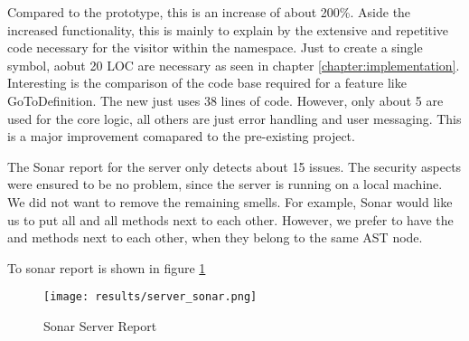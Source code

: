 Compared to the prototype, this is an increase of about 200\%.
Aside the increased functionality, this is mainly to explain by the extensive and repetitive code necessary for the visitor within the  namespace.
Just to create a single symbol, aobut 20 LOC are necessary as seen in chapter \ref{chapter:implementation}.\\

Interesting is the comparison of the code base required for a feature like GoToDefinition.
The new   just uses 38 lines of code.
However, only about 5 are used for the core logic, all others are just error handling and user messaging.
This is a major improvement comapared to the pre-existing project.

The Sonar report for the server only detects about 15 issues.
The security aspects were ensured to be no problem, since the server is running on a local machine.
We did not want to remove the remaining smells.
For example, Sonar would like us to put all  and all  methods next to each other.
However, we prefer to have the  and  methods next to each other, when they belong to the same AST node.

To sonar report is shown in figure \ref{fig:sonarserver}

\begin{figure}[H]
    \centering
    \texttt{[image: results/server\_sonar.png]}
    \caption{Sonar Server Report}
    \label{fig:sonarserver}
\end{figure}
